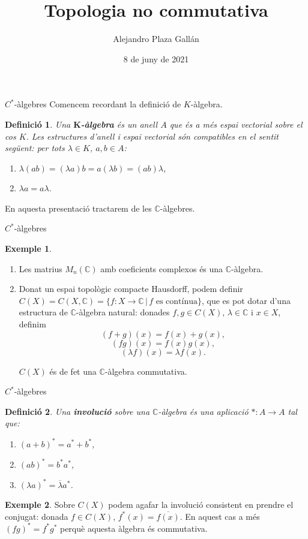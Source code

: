 \documentclass{beamer}
\title{Topologia no commutativa}
\author{Alejandro Plaza Gall\'{a}n}
\date{8 de juny de 2021}
\newtheorem{definicio}{Definici\'{o}}
\theoremstyle{definition}
\newtheorem{exemple}{Exemple}
\begin{document}
\begin{frame}
\titlepage
\end{frame}

\begin{frame}{$C^*$-\`{a}lgebres}
Comencem recordant la definici\'{o} de $K$-\`{a}lgebra.
\pause

\begin{definicio}
Una $\boldsymbol{K}$\textbf{-\`{a}lgebra} \'{e}s un anell $A$ que \'{e}s a m\'{e}s espai vectorial sobre el cos $K$. Les estructures d'anell i espai vectorial s\'{o}n compatibles en el sentit seg\"{u}ent: per tots $\lambda\in K$, $a,b\in A$:
\begin{enumerate}
\item $\lambda(ab)=(\lambda a)b=a(\lambda b)=(ab)\lambda$,
\item $\lambda a=a\lambda$.
\end{enumerate}
\end{definicio}
\pause

En aquesta presentaci\'{o} tractarem de les $\mathbb{C}$-\`{a}lgebres.
\end{frame}

\begin{frame}{$C^*$-\`{a}lgebres}
\begin{exemple}
\begin{enumerate}
\item Les matrius $M_n(\mathbb{C})$ amb coeficients complexos \'{e}s una $\mathbb{C}$-\`{a}lgebra.
\pause
\item Donat un espai topol\`{o}gic compacte Hausdorff, podem definir $C(X)=C(X,\mathbb{C})=\{f:X\rightarrow\mathbb{C}\,|\,f\text{ es cont\'{i}nua}\}$, \pause que es pot dotar d'una estructura de $\mathbb{C}$-\`{a}lgebra natural: donades $f,g\in C(X)$, $\lambda\in\mathbb{C}$ i $x\in X$, definim
\[(f+g)(x)=f(x)+g(x),\]
\[(fg)(x)=f(x)g(x),\]
\[(\lambda f)(x)=\lambda f(x).\]

$C(X)$ \'{e}s de fet una $\mathbb{C}$-\`{a}lgebra commutativa.
\end{enumerate}
\end{exemple}
\end{frame}

\begin{frame}{$C^*$-\`{a}lgebres}
\begin{definicio}
Una \textbf{involuci\'{o}} sobre una $\mathbb{C}$-\`{a}lgebra \'{e}s una aplicaci\'{o} $*:A\rightarrow A$ tal que:
\begin{enumerate}
\item $(a+b)^*=a^*+b^*$,
\item $(ab)^*=b^*a^*$,
\item $(\lambda a)^*=\overline\lambda a^*$.
\end{enumerate}
\end{definicio}
\pause

\begin{exemple}
Sobre $C(X)$ podem agafar la involuci\'{o} consistent en prendre el conjugat: donada $f\in C(X)$, $f^*(x)=\overline{f(x)}$. En aquest cas a m\'{e}s $(fg)^*=f^*g^*$ perqu\`{e} aquesta \`{a}lgebra \'{e}s commutativa.
\end{exemple}
\end{frame}
\end{document}
